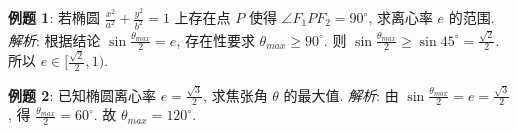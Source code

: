 \begin{examplebox}
\textbf{例题 1}: 若椭圆 $\frac{x^2}{a^2} + \frac{y^2}{b^2} = 1$ 上存在点 $P$ 使得 $\angle F_1PF_2 = 90^\circ$, 求离心率 $e$ 的范围.
\textit{解析}: 
根据结论 $\sin\frac{\theta_{max}}{2} = e$, 存在性要求 $\theta_{max} \ge 90^\circ$.
则 $\sin\frac{\theta_{max}}{2} \ge \sin 45^\circ = \frac{\sqrt{2}}{2}$.
所以 $e \in [\frac{\sqrt{2}}{2}, 1)$.

\textbf{例题 2}: 已知椭圆离心率 $e = \frac{\sqrt{3}}{2}$, 求焦张角 $\theta$ 的最大值.
\textit{解析}:
由 $\sin\frac{\theta_{max}}{2} = e = \frac{\sqrt{3}}{2}$, 得 $\frac{\theta_{max}}{2} = 60^\circ$.
故 $\theta_{max} = 120^\circ$.
\end{examplebox}